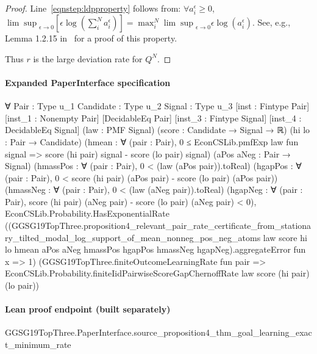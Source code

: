 \documentclass[10pt]{article}
\begin{document}
\begin{ReviewVerbatim}
\begin{proof}
Line~\eqref{eqnstep:ldpproperty} follows from: $\forall a^\epsilon_i \geq 0$, ${\lim \sup}_{\epsilon \to 0} \left[\epsilon\log\left(\sum_i^N a^\epsilon_i\right)\right] = \max^N_i {\lim \sup}_{\epsilon \to 0} \epsilon \log(a^\epsilon_i)$.
See, e.g., Lemma 1.2.15 in~\cite{dembo_large_2010} for a proof of this property.

Thus $r$ is the large deviation rate for $Q^N$.

\end{proof}
\end{ReviewVerbatim}


\paragraph{Expanded PaperInterface specification}
\begin{ReviewVerbatim}
∀ {Pair : Type u_1} {Candidate : Type u_2} {Signal : Type u_3} [inst : Fintype Pair] [inst_1 : Nonempty Pair]
  [DecidableEq Pair] [inst_3 : Fintype Signal] [inst_4 : DecidableEq Signal] (law : PMF Signal)
  (score : Candidate → Signal → ℝ) (hi lo : Pair → Candidate)
  (hmean : ∀ (pair : Pair), 0 ≤ EconCSLib.pmfExp law fun signal => score (hi pair) signal - score (lo pair) signal)
  (aPos aNeg : Pair → Signal) (hmassPos : ∀ (pair : Pair), 0 < (law (aPos pair)).toReal)
  (hgapPos : ∀ (pair : Pair), 0 < score (hi pair) (aPos pair) - score (lo pair) (aPos pair))
  (hmassNeg : ∀ (pair : Pair), 0 < (law (aNeg pair)).toReal)
  (hgapNeg : ∀ (pair : Pair), score (hi pair) (aNeg pair) - score (lo pair) (aNeg pair) < 0),
  EconCSLib.Probability.HasExponentialRate
    ((GGSG19TopThree.proposition4_relevant_pair_rate_certificate_from_stationary_tilted_modal_log_support_of_mean_nonneg_pos_neg_atoms
          law score hi lo hmean aPos aNeg hmassPos hgapPos hmassNeg hgapNeg).aggregateError
      fun x => 1)
    (GGSG19TopThree.finiteOutcomeLearningRate fun pair =>
      EconCSLib.Probability.finiteIidPairwiseScoreGapChernoffRate law score (hi pair) (lo pair))
\end{ReviewVerbatim}

\paragraph{Lean proof endpoint (built separately)}\begin{ReviewVerbatim}
GGSG19TopThree.PaperInterface.source_proposition4_thm_goal_learning_exact_minimum_rate
\end{ReviewVerbatim}
\end{document}
